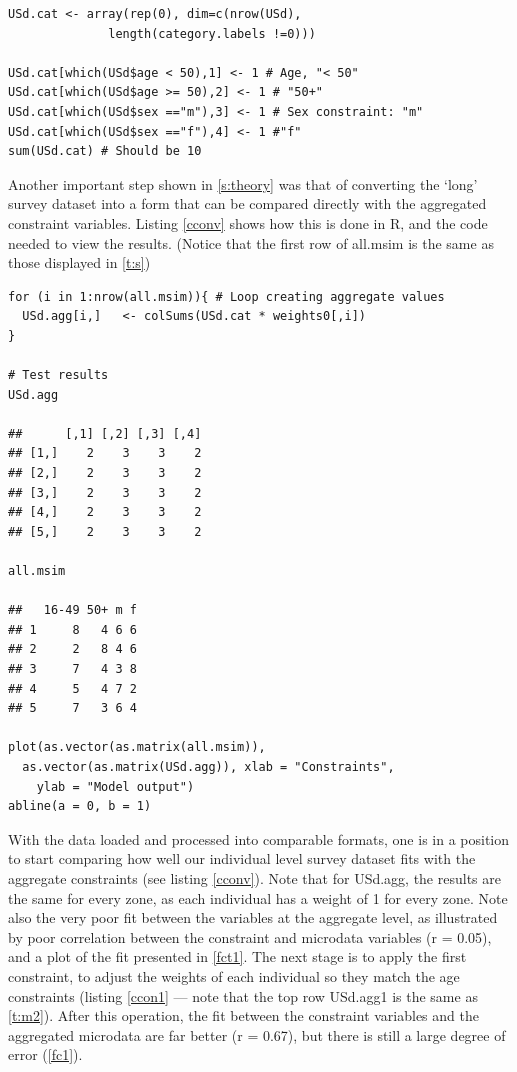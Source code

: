 \documentclass[a4paper, 11pt, twoside]{article}
\begin{document}
\begin{lstlisting}[float = h, caption={R code to convert the survey
dataset into binary form}, label=ccat]
USd.cat <- array(rep(0), dim=c(nrow(USd),
			  length(category.labels !=0)))

USd.cat[which(USd$age < 50),1] <- 1 # Age, "< 50"
USd.cat[which(USd$age >= 50),2] <- 1 # "50+"
USd.cat[which(USd$sex =="m"),3] <- 1 # Sex constraint: "m"
USd.cat[which(USd$sex =="f"),4] <- 1 #"f"
sum(USd.cat) # Should be 10
\end{lstlisting}

Another important step shown in \cref{s:theory} was that of converting the
`long' survey dataset into a form that can be compared directly with the
aggregated constraint variables. Listing \ref{cconv} shows how this is done
in R, and the code needed to view the results. (Notice that the first row
of all.msim is the same as those displayed in \cref{t:s})

\begin{lstlisting}[float=h, caption={R code to aggregate the survey dataset},
label=cconv]
 for (i in 1:nrow(all.msim)){ # Loop creating aggregate values 
  USd.agg[i,]   <- colSums(USd.cat * weights0[,i])
}

# Test results
USd.agg

##      [,1] [,2] [,3] [,4]
## [1,]    2    3    3    2
## [2,]    2    3    3    2
## [3,]    2    3    3    2
## [4,]    2    3    3    2
## [5,]    2    3    3    2

all.msim

##   16-49 50+ m f
## 1     8   4 6 6
## 2     2   8 4 6
## 3     7   4 3 8
## 4     5   4 7 2
## 5     7   3 6 4

plot(as.vector(as.matrix(all.msim)),
  as.vector(as.matrix(USd.agg)), xlab = "Constraints",
    ylab = "Model output")
abline(a = 0, b = 1)
\end{lstlisting}

With the data loaded and processed into comparable formats, one is in a
position to start comparing how well our individual level survey dataset
fits with the aggregate constraints (see listing \ref{cconv}). Note that for USd.agg,
the results are the same for every zone, as each individual has a weight of 1
for every zone. Note also the very poor fit between the variables at the
aggregate level, as illustrated by poor correlation between the constraint and
microdata variables (r = 0.05), and a plot of the fit presented in \cref{fct1}.
The next stage is to apply the first constraint,
to adjust the weights of each individual so they match the age constraints
(listing \ref{ccon1} --- note that the top row USd.agg1 is the same as
\cref{t:m2}). After this operation, the fit between the constraint
variables and the aggregated microdata are far better (r = 0.67), but there
is still a large degree of error (\cref{fc1}).
\end{document}
